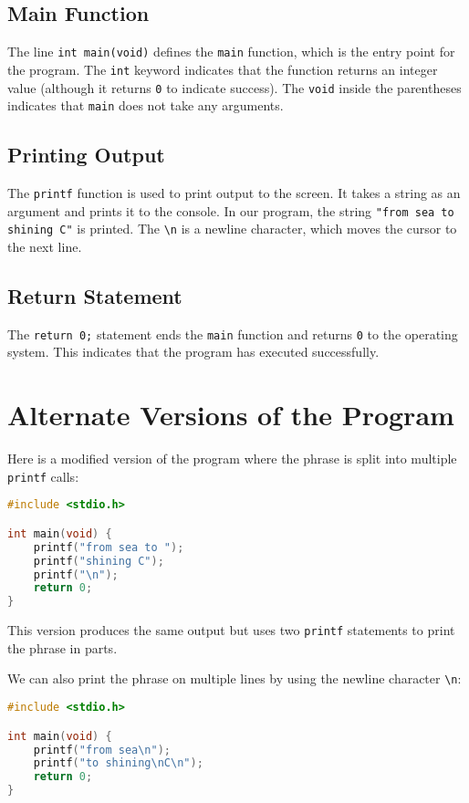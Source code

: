 \documentclass{article}
\begin{document}
\subsection*{Main Function}
The line \texttt{int main(void)} defines the \texttt{main} function, which is the entry point for the program. The \texttt{int} keyword indicates that the function returns an integer value (although it returns \texttt{0} to indicate success). The \texttt{void} inside the parentheses indicates that \texttt{main} does not take any arguments.

\subsection*{Printing Output}
The \texttt{printf} function is used to print output to the screen. It takes a string as an argument and prints it to the console. In our program, the string \texttt{"from sea to shining C\n"} is printed. The \texttt{\textbackslash n} is a newline character, which moves the cursor to the next line.

\subsection*{Return Statement}
The \texttt{return 0;} statement ends the \texttt{main} function and returns \texttt{0} to the operating system. This indicates that the program has executed successfully.

\section*{Alternate Versions of the Program}

Here is a modified version of the program where the phrase is split into multiple \texttt{printf} calls:

\begin{lstlisting}[language=C]
#include <stdio.h>

int main(void) {
    printf("from sea to ");
    printf("shining C");
    printf("\n");
    return 0;
}
\end{lstlisting}

This version produces the same output but uses two \texttt{printf} statements to print the phrase in parts.

We can also print the phrase on multiple lines by using the newline character \texttt{\textbackslash n}:

\begin{lstlisting}[language=C]
#include <stdio.h>

int main(void) {
    printf("from sea\n");
    printf("to shining\nC\n");
    return 0;
}
\end{lstlisting}
\end{document}
